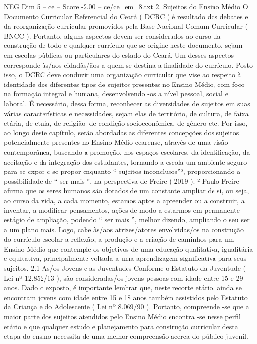 \begin{textsample}{NEG Dim 5 – ce – Score -2.00 – ce/ce\_em\_8.txt}  \label{ex:f5_neg_034}
2.
Sujeitos do Ensino Médio O Documento Curricular Referencial do Ceará ( DCRC ) é resultado dos debates e da reorganização curricular promovidos pela Base Nacional Comum Curricular ( BNCC ).
Portanto, alguns aspectos devem ser considerados ao curso da construção de todo e qualquer currículo que se origine neste documento, sejam em escolas públicas ou particulares do estado do Ceará.
Um desses aspectos corresponde às/aos cidadãs/ãos a quem se destina a finalidade do currículo.
Posto isso, o DCRC deve conduzir uma organização curricular que vise ao respeito à identidade dos diferentes tipos de sujeitos presentes no Ensino Médio, com foco na formação integral e humana, desenvolvendo -os a nível pessoal, social e laboral.
É necessário, dessa forma, reconhecer as diversidades de sujeitos em suas várias características e necessidades, sejam elas de território, de cultura, de faixa etária, de etnia, de religião, de condição socioeconômica, de gênero etc.
Por isso, ao longo deste capítulo, serão abordadas as diferentes concepções dos sujeitos potencialmente presentes no Ensino Médio cearense, através de uma visão contemporânea, buscando a promoção, nos espaços escolares, da identificação, da aceitação e da integração dos estudantes, tornando a escola um ambiente seguro para se expor e se propor enquanto “ sujeitos inconclusos”², proporcionando a possibilidade de “ ser mais ”, na perspectiva de Freire ( 2019 ). ² Paulo Freire afirma que os seres humanos são dotados de um constante ampliar de si, ou seja, ao curso da vida, a cada momento, estamos aptos a apreender ou a construir, a inventar, a modificar pensamentos, ações de modo a estarmos em permanente estágio de ampliação, podendo “ ser mais ”, melhor dizendo, ampliando o seu ser a um plano mais.
Logo, cabe às/aos atrizes/atores envolvidas/os na construção do currículo escolar a reflexão, a produção e a criação de caminhos para um Ensino Médio que contemple os objetivos de uma educação qualitativa, igualitária e equitativa, principalmente voltada a uma aprendizagem significativa para seus sujeitos. 2.1 As/os Jovens e as Juventudes Conforme o Estatuto da Juventude ( Lei nº 12.852/13 ), são consideradas/os jovens pessoas com idade entre 15 e 29 anos.
Dado o exposto, é importante lembrar que, neste recorte etário, ainda se encontram jovens com idade entre 15 e 18 anos também assistidos pelo Estatuto da Criança e do Adolescente ( Lei nº 8.069/90 ).
Portanto, compreende -se que a maior parte dos sujeitos atendidos pelo Ensino Médio encontra -se nesse perfil etário e que qualquer estudo e planejamento para construção curricular desta etapa do ensino necessita de uma melhor compreensão acerca do público juvenil.

\end{textsample}
